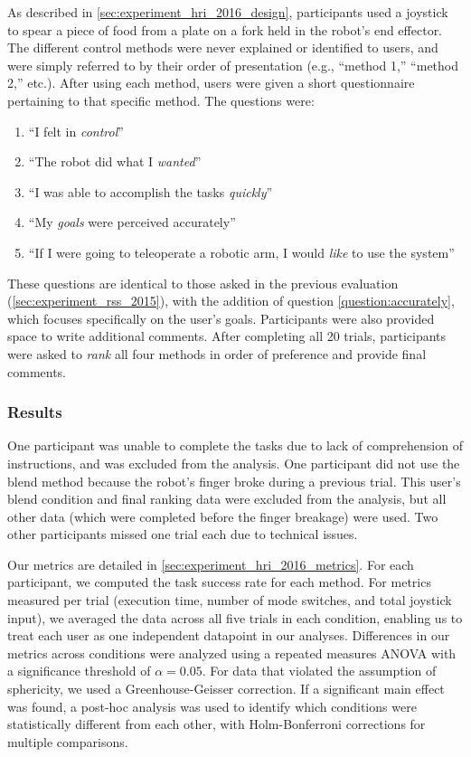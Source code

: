 As described in \cref{sec:experiment_hri_2016_design}, participants used a joystick to spear a piece of food from a plate on a fork held in the robot's end effector. The different control methods were never explained or identified to users, and were simply referred to by their order of presentation (e.g., ``method 1,'' ``method 2,'' etc.). After using each method, users were given a short questionnaire pertaining to that specific method. The questions were:
\begin{enumerate}
  \item ``I felt in \emph{control}''
  \item ``The robot did what I \emph{wanted}''
  \item ``I was able to accomplish the tasks \emph{quickly}''
  \item ``My \emph{goals} were perceived accurately''\label{question:accurately}
  \item ``If I were going to teleoperate a robotic arm, I would \emph{like} to use the system''
\end{enumerate}
These questions are identical to those asked in the previous evaluation (\cref{sec:experiment_rss_2015}), with the addition of question \ref{question:accurately}, which focuses specifically on the user's goals. Participants were also provided space to write additional comments. After completing all 20 trials, participants were asked to \emph{rank} all four methods in order of preference and provide final comments.

\subsubsection{Results}
\label{sec:results_feeding}
One participant was unable to complete the tasks due to lack of comprehension of instructions, and was excluded from the analysis. One participant did not use the blend method because the robot's finger broke during a previous trial. This user's blend condition and final ranking data were excluded from the analysis, but all other data (which were completed before the finger breakage) were used. Two other participants missed one trial each due to technical issues.


Our metrics are detailed in \cref{sec:experiment_hri_2016_metrics}. For each participant, we computed the task success rate for each method. For metrics measured per trial (execution time, number of mode switches, and total joystick input), we averaged the data across all five trials in each condition, enabling us to treat each user as one independent datapoint in our analyses. Differences in our metrics across conditions were analyzed using a repeated measures ANOVA with a significance threshold of $\alpha=0.05$. For data that violated the assumption of sphericity, we used a Greenhouse-Geisser correction. If a significant main effect was found, a post-hoc analysis was used to identify which conditions were statistically different from each other, with Holm-Bonferroni corrections for multiple comparisons. %


